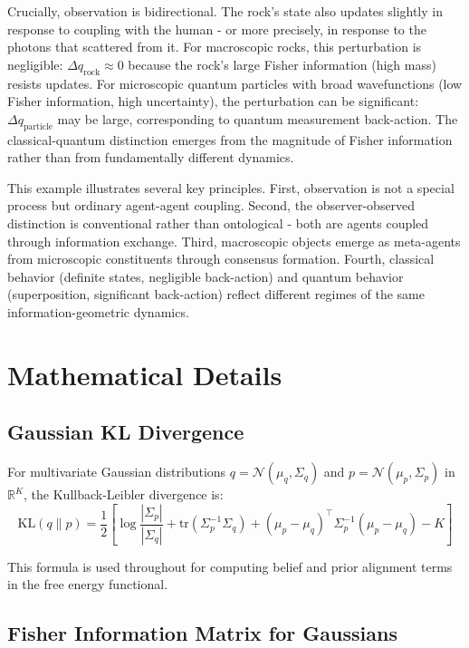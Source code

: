 \documentclass[11pt]{article}
\begin{document}
Crucially, observation is bidirectional. The rock's state also updates slightly in response to coupling with the human - or more precisely, in response to the photons that scattered from it. For macroscopic rocks, this perturbation is negligible: $\Delta q_{\text{rock}} \approx 0$ because the rock's large Fisher information (high mass) resists updates. For microscopic quantum particles with broad wavefunctions (low Fisher information, high uncertainty), the perturbation can be significant: $\Delta q_{\text{particle}}$ may be large, corresponding to quantum measurement back-action. The classical-quantum distinction emerges from the magnitude of Fisher information rather than from fundamentally different dynamics.

This example illustrates several key principles. First, observation is not a special process but ordinary agent-agent coupling. Second, the observer-observed distinction is conventional rather than ontological - both are agents coupled through information exchange. Third, macroscopic objects emerge as meta-agents from microscopic constituents through consensus formation. Fourth, classical behavior (definite states, negligible back-action) and quantum behavior (superposition, significant back-action) reflect different regimes of the same information-geometric dynamics.


\section{Mathematical Details}
\label{app:math}

\subsection{Gaussian KL Divergence}

For multivariate Gaussian distributions $q = \mathcal{N}(\mu_q, \Sigma_q)$ and $p = \mathcal{N}(\mu_p, \Sigma_p)$ in $\mathbb{R}^K$, the Kullback-Leibler divergence is:
\begin{equation}
\mathrm{KL}(q \| p) = \frac{1}{2}\left[\log\frac{|\Sigma_p|}{|\Sigma_q|} + \mathrm{tr}(\Sigma_p^{-1}\Sigma_q) + (\mu_p - \mu_q)^\top\Sigma_p^{-1}(\mu_p - \mu_q) - K\right]
\end{equation}

This formula is used throughout for computing belief and prior alignment terms in the free energy functional.

\subsection{Fisher Information Matrix for Gaussians}
\end{document}
